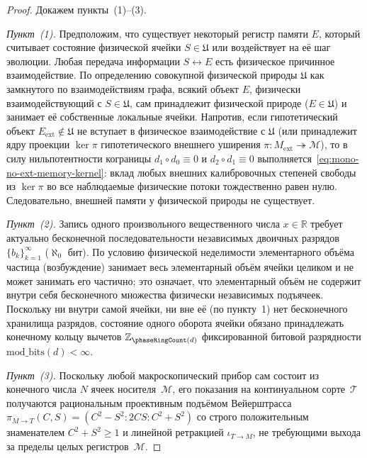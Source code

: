 \begin{proof}
Докажем пункты~(1)--(3).

\emph{Пункт~(1).} Предположим, что существует некоторый регистр памяти $E$, который считывает состояние физической ячейки $S \in \mathfrak{U}$ или воздействует на её шаг эволюции. Любая передача информации $S \leftrightarrow E$ есть физическое причинное взаимодействие. По определению совокупной физической природы $\mathfrak{U}$ как замкнутого по взаимодействиям графа, всякий объект $E$, физически взаимодействующий с $S \in \mathfrak{U}$, сам принадлежит физической природе ($E \in \mathfrak{U}$) и занимает её собственные локальные ячейки. Напротив, если гипотетический объект $E_{\mathrm{ext}} \notin \mathfrak{U}$ не вступает в физическое взаимодействие с $\mathfrak{U}$ (или принадлежит ядру проекции $\ker\pi$ гипотетического внешнего уширения $\pi : M_{\mathrm{ext}} \twoheadrightarrow \mathcal{M}$), то в силу нильпотентности кограницы $d_1 \circ d_0 \equiv 0$ и $d_2 \circ d_1 \equiv 0$ выполняется~\eqref{eq:mono-no-ext-memory-kernel}: вклад любых внешних калибровочных степеней свободы из $\ker\pi$ во все наблюдаемые физические потоки тождественно равен нулю. Следовательно, внешней памяти у физической природы не существует.

\emph{Пункт~(2).} Запись одного произвольного вещественного числа $x \in \mathbb{R}$ требует актуально бесконечной последовательности независимых двоичных разрядов $\{b_k\}_{k=1}^\infty$ ($\aleph_0$ бит). По условию физической неделимости элементарного объёма частица (возбуждение) занимает весь элементарный объём ячейки целиком и не может занимать его частично; это означает, что элементарный объём не содержит внутри себя бесконечного множества физически независимых подъячеек. Поскольку ни внутри самой ячейки, ни вне её (по пункту~1) нет бесконечного хранилища разрядов, состояние одного оборота ячейки обязано принадлежать конечному кольцу вычетов $\mathbb{Z}_{\phaseRingCount(d)}$ фиксированной битовой разрядности $\mathrm{mod\_bits}(d) < \infty$.

\emph{Пункт~(3).} Поскольку любой макроскопический прибор сам состоит из конечного числа $N$ ячеек носителя~$\mathcal{M}$, его показания на континуальном сорте~$\mathcal{T}$ получаются рациональным проективным подъёмом Вейерштрасса $\pi_{M\to T}(C, S) = (C^2-S^2 : 2CS : C^2+S^2)$ со строго положительным знаменателем $C^2+S^2 \ge 1$ и линейной ретракцией $\iota_{T\to M}$, не требующими выхода за пределы целых регистров~$\mathcal{M}$.
\end{proof}

